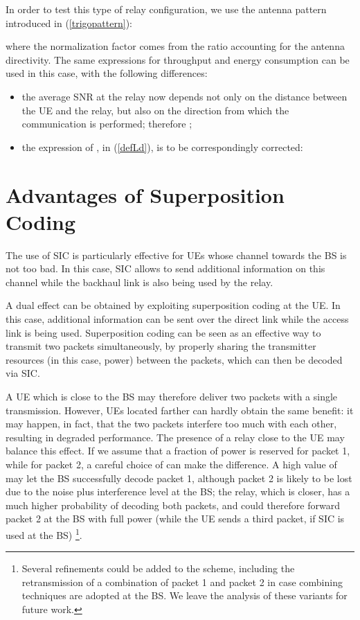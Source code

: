 \documentclass[12pt, letterpaper, onecolumn, draftcls]{IEEEtran}
\begin{document}
In order to test this type of relay configuration, we use the antenna pattern introduced in (\ref{trigopattern}):

where the normalization factor  comes from the ratio  accounting for the antenna directivity. The same expressions for throughput and energy consumption can be used in this case, with the following differences:
\begin{itemize}
 \item the average SNR at the relay now depends not only on the distance  between the UE and the relay, but also on the direction  from which the communication is performed; therefore ;
 \item the expression of , in (\ref{defLd}), is to be correspondingly corrected:
 
\end{itemize}

\section{Advantages of Superposition Coding}
\label{adv_SC}
The use of SIC is particularly effective for UEs whose channel towards the BS is not too bad. In this case, SIC allows to send additional information on this channel while the backhaul link is also being used by the relay.

A dual effect can be obtained by exploiting superposition coding at the UE. In this case, additional information can be sent over the direct link while the access link is being used. Superposition coding can be seen as an effective way to transmit two packets simultaneously, by properly sharing the transmitter resources (in this case, power) between the packets, which can then be decoded via SIC.

A UE which is close to the BS may therefore deliver two packets with a single transmission. However, UEs located farther can hardly obtain the same benefit: it may happen, in fact, that the two packets interfere too much with each other, resulting in degraded performance.
The presence of a relay close to the UE may balance this effect. If we assume that a fraction  of power is reserved for packet 1, while  for packet 2, a careful choice of  can make the difference. A high value of  may let the BS successfully decode packet 1, although packet 2 is likely to be lost due to the noise plus interference level at the BS; the relay, which is closer, has a much higher probability of decoding both packets, and could therefore forward packet 2 at the BS with full power (while the UE sends a third packet, if SIC is used at the BS)
\footnote{Several refinements could be added to the scheme, including the retransmission of a combination of packet 1 and packet 2 in case combining techniques are adopted at the BS. We leave the analysis of these variants for future work.}.
\end{document}
